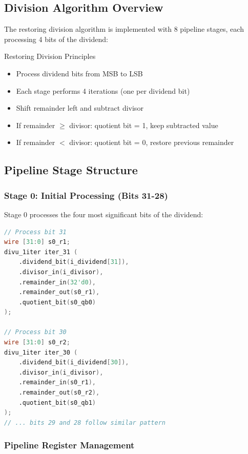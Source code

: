 \documentclass[a4paper, 11pt]{article}
\begin{document}
\subsection{Division Algorithm Overview}

The restoring division algorithm is implemented with 8 pipeline stages, each processing 4 bits of the dividend:

\begin{myblock}{Restoring Division Principles}
\begin{itemize}
    \item Process dividend bits from MSB to LSB
    \item Each stage performs 4 iterations (one per dividend bit)
    \item Shift remainder left and subtract divisor
    \item If remainder $\geq$ divisor: quotient bit = 1, keep subtracted value
    \item If remainder $<$ divisor: quotient bit = 0, restore previous remainder
\end{itemize}
\end{myblock}

\subsection{Pipeline Stage Structure}

\subsubsection{Stage 0: Initial Processing (Bits 31-28)}

Stage 0 processes the four most significant bits of the dividend:

\begin{lstlisting}[language=Verilog, caption=Stage 0 Division Operations]
// Process bit 31
wire [31:0] s0_r1;
divu_1iter iter_31 (
    .dividend_bit(i_dividend[31]),
    .divisor_in(i_divisor),
    .remainder_in(32'd0),
    .remainder_out(s0_r1),
    .quotient_bit(s0_qb0)
);

// Process bit 30
wire [31:0] s0_r2;
divu_1iter iter_30 (
    .dividend_bit(i_dividend[30]),
    .divisor_in(i_divisor),
    .remainder_in(s0_r1),
    .remainder_out(s0_r2),
    .quotient_bit(s0_qb1)
);
// ... bits 29 and 28 follow similar pattern
\end{lstlisting}

\subsubsection{Pipeline Register Management}
\end{document}
